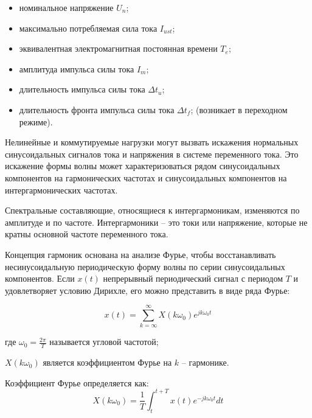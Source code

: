 \begin{itemize}
	\item номинальное напряжение $U_n$;
	
	\item максимально потребляемая сила тока $I_{ust}$;
	
	\item эквивалентная электромагнитная постоянная времени $T_{e}$;
	
	\item амплитуда импульса силы тока $I_m$;
	
	\item длительность импульса силы тока  $\varDelta t_u$;
	
	\item длительность фронта импульса силы тока $\varDelta t_f$;  (возникает в переходном режиме).
\end{itemize}

Нелинейные и коммутируемые нагрузки могут вызвать искажения нормальных синусоидальных сигналов тока и напряжения в системе переменного тока. Это искажение формы волны может характеризоваться рядом синусоидальных компонентов на гармонических частотах и синусоидальных компонентов на интергармонических частотах.
 
Спектральные составляющие, относящиеся к интергармоникам, изменяются по амплитуде и по частоте. Интергармоники – это токи или напряжение, которые не кратны основной частоте переменного тока.

Концепция гармоник основана на анализе Фурье, чтобы восстанавливать несинусоидальную периодическую форму волны по серии синусоидальных компонентов. Если $x(t)$  непрерывный периодический сигнал с периодом $T$   и удовлетворяет условию Дирихле, его можно представить в виде ряда Фурье:

\begin{equation}
	\label{eq:equation1.1}
x(t) = \displaystyle\sum_{k=\infty}^{\infty} X(k \omega_{0}) e^{jk \omega_{0} t}
\end{equation}

где $\omega_0 = \frac{2 \pi}{T}$  называется угловой частотой;
 
$X(k \omega_{0})$ является коэффициентом Фурье на $k$ – гармонике.  

Коэффициент Фурье определяется как:
\begin{equation}
\label{eq:equation1.2}
X(k \omega_{0}) =  \frac{1}{T} \int_t^{t+T} x(t) e^{-jk \omega_{0} t} {d}t
\end{equation}

